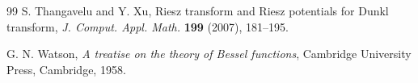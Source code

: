 \documentclass[11pt]{article}
\theoremstyle{plain}
\theoremstyle{remark}
\numberwithin{equation}{section} %
\begin{document}
\begin{thebibliography}{99}
S. Thangavelu and Y. Xu,
Riesz transform and Riesz potentials for Dunkl transform,
\textit{J. Comput. Appl. Math.}
\textbf{199} (2007), 181--195.


G. N. Watson,
\textit{A treatise on the theory of Bessel functions},
Cambridge University Press, Cambridge, 1958.




\end{thebibliography}

\end{document}
